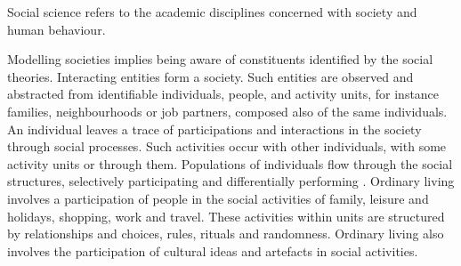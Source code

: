 \documentclass[11pt,oneside,a4paper,openright]{report}
\begin{document}
Social science refers to the academic disciplines concerned with society and human behaviour\cite[p.7,chap.3]{MWilliams1999}.
 
Modelling societies implies being aware of constituents identified by the social theories. Interacting entities form a society. Such entities are observed and abstracted from identifiable individuals, people, and activity units, for instance families, neighbourhoods or job partners, composed also of the same individuals. An individual leaves a trace of participations and interactions in the society through social processes. Such activities occur with other individuals, with some activity units or through them. Populations of individuals flow through the social structures, selectively participating and differentially performing \cite[p.8]{GordonBurt2010}. 
Ordinary living involves a participation of people in the social activities of family, leisure and holidays, shopping, work and travel. These activities within units are structured by relationships and choices, rules, rituals and randomness. Ordinary living also involves the participation of cultural ideas and artefacts in social activities.
\end{document}
